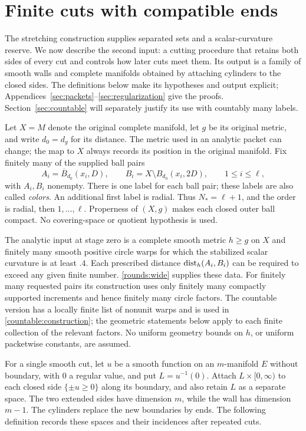\section{Finite cuts with compatible ends}\label{sec:finite-cuts}

The stretching construction supplies separated sets and a scalar-curvature
reserve. We now describe the second input: a cutting procedure that retains
both sides of every cut and controls how later cuts meet them. Its output is
a family of smooth walls and complete manifolds obtained by attaching
cylinders to the closed sides. The definitions below make its hypotheses
and output explicit; Appendices~\ref{sec:packets}--\ref{sec:regularization}
give the proofs. Section~\ref{sec:countable} will separately justify its use
with countably many labels.

Let $X=M$ denote the original complete manifold, let $g$ be its original
metric, and write $d_0=d_g$ for its distance.  The metric used in an analytic
packet can change; the map to $X$ always records its position in the
original manifold.  Fix finitely many of the supplied ball pairs
\[
 A_i=\overline B_{d_0}(x_i,D),\qquad
 B_i=X\setminus B_{d_0}(x_i,2D),\qquad 1\le i\le\ell,
\]
with $A_i,B_i$ nonempty. There is one label for each ball pair; these
labels are also called \emph{colors}. An additional first label is radial.
Thus $N_*=\ell+1$, and the order is
radial, then $1,\ldots,\ell$.  Properness of $(X,g)$ makes each closed
outer ball compact.  No covering-space or quotient hypothesis is used.

The analytic input at stage zero is a complete smooth metric $h\ge g$ on $X$
and finitely many smooth positive circle warps for which the stabilized
scalar curvature is at least $.4$.  Each prescribed distance
$\operatorname{dist}_h(A_i,B_i)$ can be required to exceed any given finite number.
\cref{rounds:wide} supplies these data.  For finitely many requested
pairs its construction uses only finitely many compactly supported
increments and hence finitely many circle factors.  The countable
version has a locally finite list of nonunit warps and is used in
\cref{countable:construction}; the geometric statements below apply to
each finite collection of the relevant factors.  No uniform geometry
bounds on $h$, or uniform packetwise constants, are assumed.

For a single smooth cut, let $u$ be a smooth function on an
$m$-manifold $E$ without boundary, with $0$ a regular value, and put
$L=u^{-1}(0)$.
Attach $L\times[0,\infty)$ to each closed side $\{\pm u\ge0\}$
along its boundary, and also retain $L$ as a separate space.
The two extended sides have dimension $m$, while the wall has dimension
$m-1$. The cylinders replace the new boundaries by ends.
The following definition records these spaces and their incidences
after repeated cuts.

